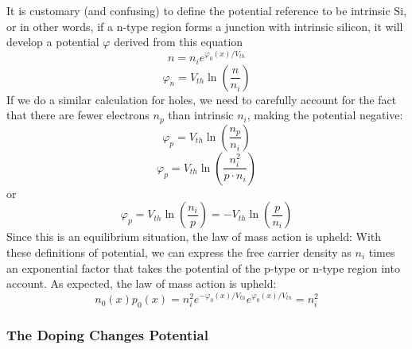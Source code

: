 It is customary (and confusing) to define the potential reference to be intrinsic Si, or in other words, if a n-type region forms a junction with intrinsic silicon, it will develop a potential $\varphi$ derived from this equation
\begin{equation} 
	{n} = {n_i}{e^{{\varphi _0}(x)/{V_{th}}}} 
\end{equation}
\begin{equation} 
	\varphi_n = V_{th} \ln\left( \frac{n}{n_i}  \right)
\end{equation}
%
If we do a similar calculation for holes, we need to carefully account for the fact that there are fewer electrons $n_p$ than intrinsic $n_i$, making the potential negative:
\begin{equation} 
	\varphi_p = V_{th} \ln\left( \frac{n_p}{n_i}  \right)
\end{equation}
%
\begin{equation} 
	\varphi_p = V_{th} \ln\left( \frac{n_i^2}{p \cdot n_i}  \right)
\end{equation}
or
\begin{equation} 
	\varphi_p = V_{th} \ln\left( \frac{n_i}{p}  \right) = - V_{th} \ln\left( \frac{p}{n_i}  \right) 
\end{equation}
%
Since this is an equilibrium situation, the law of mass action is upheld:
%
With these definitions of potential, we can express the free carrier density as $n_i$ times an exponential factor that takes the potential of the p-type or n-type region into account.  As expected, the law of mass action is upheld:
\begin{equation} 
	{n_0}(x){p_0}(x) = n_i^2{e^{ - {\varphi _0}(x)/{V_{th}}}}{e^{{\varphi _0}(x)/{V_{th}}}} = n_i^2 
\end{equation}
 

\subsubsection{The Doping Changes Potential}

